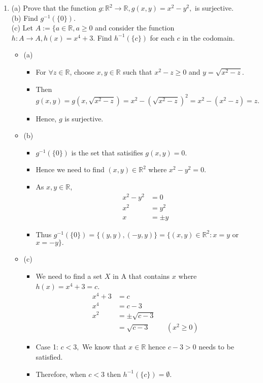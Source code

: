 \documentclass[letterpaper,12pt]{article}
\begin{document}
\begin{enumerate}
\item (a) Prove that the function $g : \mathbb{R}^2 \rightarrow \mathbb{R}, g(x,y) = x^2-y^2,$ is surjective.\\
	(b) Find $g^{-1}(\{0\}).$\\
	(c) Let $A := \{a \in \mathbb{R},a \geq 0$ and consider the function $h: A \rightarrow A,h(x)=x^4+3 .$ Find $h^{-1}(\{c\})$ for each $c$ in the codomain.
	\begin{itemize}
		\item (a)
		\begin{itemize}
		\item For $\forall z\in \mathbb{R}$, choose $x,y \in \mathbb{R}$ such that $x^2-z \geq 0 $ and $y = \sqrt{x^2-z}$.
		\item Then $g(x,y)=g(x,\sqrt{x^2-z}) = x^2-(\sqrt{x^2-z})^2=x^2-(x^2-z)=z.$
		\item Hence, $g$ is surjective.
		\end{itemize}
		\item (b)
		\begin{itemize}
		\item $g^{-1}(\{0\})$ is the set that satisifies $g(x,y) = 0$.
		\item Hence we need to find $(x,y) \in \mathbb{R}^2$ where $x^2-y^2=0$.
		\item As $x,y \in \mathbb{R}$, 
		\begin{align}
			x^2-y^2 &=0 \\ x^2 &= y^2 \\ x &= \pm y
		\end{align}
		\item Thus $g^{-1}(\{0\}) = \{(y,y),(-y,y)\} = \{(x,y) \in \mathbb{R}^2 : x=y $ or $ x=-y\}.$
		\end{itemize}
		\item (c)
		\begin{itemize}
		\item We need to find a set $X$ in A  that contains $x$ where $h(x) = x^4+3 = c$.
		\begin{align}
			x^4+3 &= c \\x^4 &=c-3\\x^2 &= \pm \sqrt{c-3} \\&= \sqrt{c-3}  &&(x^2\geq0)
		\end{align} 
		\item Case 1: $c < 3,$ We know that $x \in \mathbb{R}$ hence $c-3 >0 $ needs to be satisfied.
		\item Therefore, when $c<3$ then $h^{-1}(\{c\}) = \emptyset$.

\end{itemize}
\end{itemize}
\end{enumerate}
\end{document}

